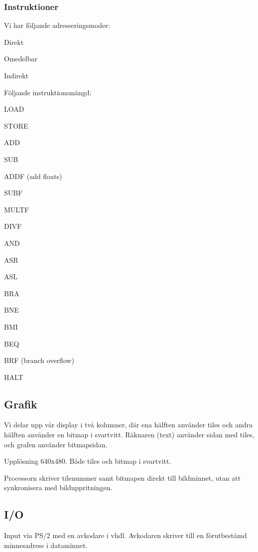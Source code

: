 \documentclass[]{article}
\begin{document}
\subsubsection{Instruktioner}
Vi har följande adresseringsmoder:
\begin{itemize*}
\item Direkt
\item Omedelbar
\item Indirekt 
\end{itemize*}
Följande instruktionsmängd:
\begin{itemize*}
\item LOAD
\item STORE
\item ADD
\item SUB
\item ADDF (add floats)
\item SUBF
\item MULTF
\item DIVF
\item AND
\item ASR
\item ASL
\item BRA
\item BNE
\item BMI
\item BEQ
\item BRF (branch overflow)
\item HALT	
\end{itemize*}

\subsection{Grafik} 
Vi delar upp vår display i två kolumner, där ena hälften använder tiles och andra hälften använder en bitmap i svartvitt. Räknaren (text) använder sidan med tiles, och grafen använder bitmapsidan.

Upplösning 640x480. Både tiles och bitmap i svartvitt.

Processorn skriver tilenummer samt bitmapen direkt till bildminnet, utan att synkronisera med bilduppritningen.

\subsection{I/O}
Input via PS/2 med en avkodare i vhdl. Avkodaren skriver till en förutbestämd minnesadress i dataminnet.
\end{document}
